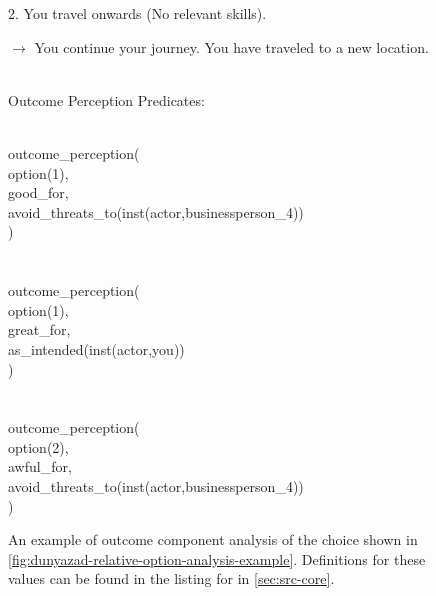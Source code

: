 \begin{enumerate}[leftmargin=1.4em]
\begin{figure}[!p]
{{{\begin{hangparas}{1.3em}{1}
2. You travel onwards (No relevant skills). \\
\ind \parbox{0.88\linewidth}{$\rightarrow$ You continue your journey. \newline You have traveled to a new location.}
\end{hangparas}
} \vind \\
Outcome Perception Predicates:\svind \\
\ind \parbox{0.85\textwidth}{ \tt \raggedright
{} \\
\ind outcome\_perception( \\
\ind \ind option(1), \\
\ind \ind good\_for, \\
\ind \ind avoid\_threats\_to(inst(actor,businessperson\_4)) \\
\ind ) \\
 \\
 \\
\ind outcome\_perception( \\
\ind \ind option(1), \\
\ind \ind great\_for, \\
\ind \ind as\_intended(inst(actor,you)) \\
\ind ) \\
 \\
 \\
\ind outcome\_perception( \\
\ind \ind option(2), \\
\ind \ind awful\_for, \\
\ind \ind avoid\_threats\_to(inst(actor,businessperson\_4)) \\
\ind ) \\
}
}
}
\caption[\dunyazad/ outcome component analysis example]{An example of outcome component analysis of the choice shown in \cref{fig:dunyazad-relative-option-analysis-example}. Definitions for these  values can be found in the listing for  in \cref{sec:src-core}.}
\label{fig:dunyazad-outcome-component-analysis-example}
\end{figure}


\end{enumerate}
